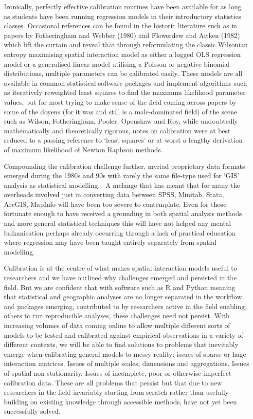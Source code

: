 \documentclass[11pt,letterpaper]{article}
\begin{document}
Ironically, perfectly effective calibration routines have
been available for as long as students have been running regression models in
their introductory statistics classes.
Occasional references can be found in
the historic literature such as in papers by Fotheringham and Webber (1980) and
Flowerdew and Aitken (1982) which lift the curtain and reveal that through
reformulating the classic Wilsonian entropy maximising spatial interaction
model as either a logged OLS regression model or a generalised linear model utilising
a Poisson or negative binomial distributions, multiple parameters can be
calibrated easily.
These models are all available in common statistical
software packages and implement algorithms such as iteratively reweighted least
squares to find the maximum likelihood parameter values, but for most trying to
make sense of the field coming across papers by some of the doyens (for it was and
still is a male-dominated field) of the scene such as Wilson, Fotheringham,
Pooler, Openshaw and Roy, while undoubtedly mathematically and theoretically
rigorous, notes on calibration were at best reduced to a passing reference to
`least squares' or at worst a lengthy derivation of maximum likelihood of
Newton Raphson methods.

Compounding the calibration challenge further, myriad
proprietary data formats emerged during the 1980s and 90s with rarely the same
file-type used for `GIS' analysis as statistical modelling.
~A melange that has meant that for many the
overheads involved just in converting data between SPSS, Minitab, Stata, ArcGIS,
MapInfo will have been too severe to contemplate.
Even for those fortunate
enough to have received a grounding in both spatial analysis methods and more
general statistical techniques this will have not helped any mental balkanisation
perhaps already occurring through a lack of practical education where
regression may have been taught entirely separately from spatial modelling.

Calibration is at the centre of what makes spatial
interaction models useful to researchers and we have outlined why challenges
emerged and persisted in the field.
But we are confident that with software
such as R and Python meaning that statistical and geographic analyses are no
longer separated in the workflow and packages emerging, contributed to by researchers
active in the field enabling others to run reproducible analyses, these
challenges need not persist.
With increasing volumes of data coming online to
allow multiple different sorts of models to be tested and calibrated against
empirical observations in a variety of different contexts, we will be able to
find solutions to problems that inevitably emerge when calibrating general
models to messy reality: issues of sparse or huge interaction matrices.
Issues
of multiple scales, dimensions and aggregations.
Issues of spatial
non-stationarity.
Issues of incomplete, poor or otherwise imperfect calibration
data.
These are all problems that persist but that due to new researchers in
the field invariably starting from scratch rather than usefully building on
existing knowledge through accessible methods, have not yet been successfully
solved.
\end{document}
